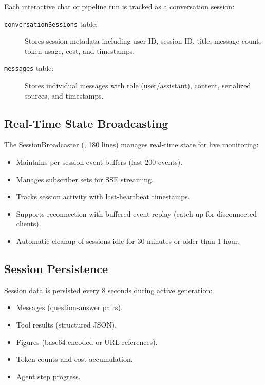 Each interactive chat or pipeline run is tracked as a conversation session:

\begin{description}
  \item[\texttt{conversationSessions} table:] Stores session metadata including user ID, session ID, title, message count, token usage, cost, and timestamps.
  \item[\texttt{messages} table:] Stores individual messages with role (user/assistant), content, serialized sources, and timestamps.
\end{description}

\subsection{Real-Time State Broadcasting}

The SessionBroadcaster (, 180 lines) manages real-time state for live monitoring:

\begin{itemize}
  \item Maintains per-session event buffers (last 200 events).
  \item Manages subscriber sets for SSE streaming.
  \item Tracks session activity with last-heartbeat timestamps.
  \item Supports reconnection with buffered event replay (catch-up for disconnected clients).
  \item Automatic cleanup of sessions idle for 30 minutes or older than 1 hour.
\end{itemize}

\subsection{Session Persistence}

Session data is persisted every 8 seconds during active generation:
\begin{itemize}
  \item Messages (question-answer pairs).
  \item Tool results (structured JSON).
  \item Figures (base64-encoded or URL references).
  \item Token counts and cost accumulation.
  \item Agent step progress.
\end{itemize}

